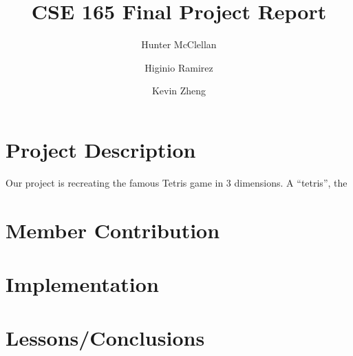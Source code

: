 \documentclass[letterpaper, 12pt]{article}
\title{CSE 165 Final Project Report}
\author{Hunter McClellan \and Higinio Ramirez \and Kevin Zheng}
\begin{document}
\maketitle
\section{Project Description}
Our project is recreating the famous Tetris game in 3 dimensions.
A ``tetris'', the 
\section{Member Contribution}
\section{Implementation}
\section{Lessons/Conclusions}
\end{document}
